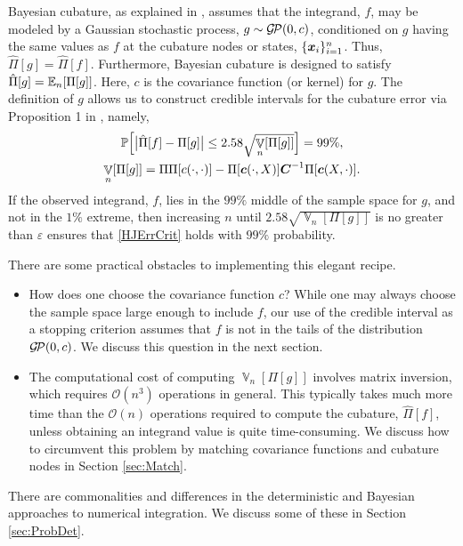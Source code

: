 \documentclass[sts]{imsart}
\numberwithin{equation}{section}
\theoremstyle{plain}
\newcommand{\vC}{\boldsymbol{C}}
\newcommand{\calGP}{\cg\!\cp}
\DeclareMathOperator{\Var}{\mathbb{V}}
\newcommand{\BOGOS}{\citetalias{BriEtal18a}}%
\begin{document}
Bayesian cubature, as explained in \BOGOS{}, assumes that the integrand, $f$, may be modeled by a Gaussian stochastic process, $g \sim \calGP(0,c)$, conditioned on $g$ having the same values as $f$ at the cubature nodes or states, $\{\boldsymbol{x}_i\}_{i=1}^n$.  Thus, $\hat{\Pi}[g] = \hat{\Pi}[f]$.  Furthermore, Bayesian cubature is designed to satisfy $\hat{\Pi}[g] = \operatorname{\mathbb{E}}_n[\Pi[g]]$.  Here, $c$ is the covariance function (or kernel) for $g$.  The definition of $g$ allows us to construct credible intervals for the cubature error via Proposition 1 in  \BOGOS{}, namely,
\begin{gather}
\label{credInt}
    \Prob\Bigl[\bigl \lvert \hat{\Pi}[f] - \Pi[g] \bigr \rvert \le 2.58 \sqrt{\Var_n[\Pi[g]]}  \Bigr] = 99\%, \\
    \label{Vnform}
    \Var_n[\Pi[g]] = \Pi\Pi[c(\cdot,\cdot)] - \Pi[\vc(\cdot,X)] \vC^{-1} \Pi[\vc(X,\cdot)].
\end{gather}
If the observed integrand, $f$, lies in the $99\%$ middle of the sample space for $g$, and not in the $1\%$ extreme, then increasing $n$ until $2.58 \sqrt{\Var_n[\Pi[g]]}$ is no greater than $\varepsilon$ ensures that  \eqref{HJErrCrit} holds with $99\%$ probability.

There are some practical obstacles to implementing this elegant recipe. 

\begin{itemize} 

\item How does one choose the covariance function $c$?  While one may always choose the sample space large enough to include $f$, our use of the credible interval as a stopping criterion assumes that $f$ is not in the tails of the distribution $\calGP(0,c)$.  We discuss this question in the next section.  

\item The computational cost of computing $\Var_n[\Pi[g]]$ involves matrix inversion, which requires $\mathcal{O}(n^3)$ operations in general.  This typically takes much more time than the $\mathcal{O}(n)$ operations required to compute the cubature, $\hat{\Pi}[f]$, unless obtaining an integrand value is quite time-consuming. We discuss how to circumvent this problem by matching covariance functions and cubature nodes in Section \ref{sec:Match}.

\end{itemize}
There are commonalities and differences in the deterministic and Bayesian approaches to numerical integration.  We discuss some of these in Section \ref{sec:ProbDet}.
\end{document}
